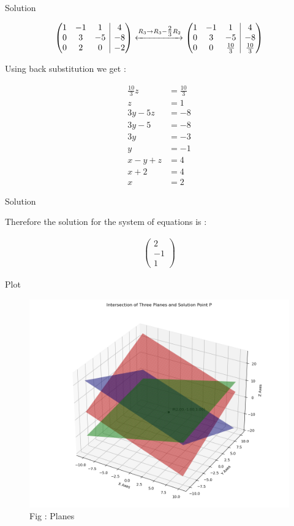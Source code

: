 \documentclass{beamer}
\makeatletter
\numberwithin{equation}{section}
\theoremstyle{remark}
\newcommand{\myvec}[1]{\ensuremath{\begin{pmatrix}#1\end{pmatrix}}}
\newenvironment{amatrix}[1]{%
  \left(\begin{array}{@{}*{#1}{c}|c@{}}
}{%
  \end{array}\right)
}
\newcommand{\myaugvec}[2]{\ensuremath{\begin{amatrix}{#1}#2\end{amatrix}}}
\makeatother
\begin{document}
\begin{frame}{Solution}

\begin{align}
  \myaugvec{3}{1 & -1 & 1 & 4\\0 & 3 & -5 & -8\\0 & 2 & 0 & -2}
  \xleftrightarrow{R_3 \to R_3 -\tfrac{2}{3}R_2}
  \myaugvec{3}{1 & -1 & 1 & 4\\0 & 3 & -5 & -8\\0 & 0 & \tfrac{10}{3} & \tfrac{10}{3}}
\end{align}

Using back substitution we get :

\begin{align}
  \tfrac{10}{3} z &= \tfrac{10}{3}\\ 
  z &= 1\\
  3y - 5z &= -8\\
  3y - 5 &= -8\\
  3y &= -3\\
  y &= -1\\
  x - y + z &= 4\\
  x + 2 &= 4\\
  x &= 2
\end{align}

\end{frame}

\begin{frame}{Solution}

Therefore the solution for the system of equations is : 

\begin{align}
  \myvec{2\\-1\\1}
\end{align}

\end{frame}

\begin{frame}{Plot}

\begin{figure}[h!]
  \centering
  \includegraphics[width=0.8\columnwidth]{figs/solution.png} 
   \caption*{Fig : Planes}
  \label{Fig1}
\end{figure}

\end{frame}
\end{document}
